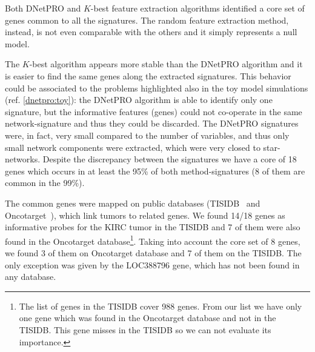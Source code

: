 \documentclass{standalone}
\begin{document}
Both \textsf{DNetPRO} and $K$-best feature extraction algorithms identified a core set of genes common to all the signatures.
The random feature extraction method, instead, is not even comparable with the others and it simply represents a null model.

The $K$-best algorithm appears more stable than the \textsf{DNetPRO} algorithm and it is easier to find the same genes along the extracted signatures.
This behavior could be associated to the problems highlighted also in the toy model simulations (ref. \ref{dnetpro:toy}): the \textsf{DNetPRO} algorithm is able to identify only one signature, but the informative features (genes) could not co-operate in the same network-signature and thus they could be discarded.
The \textsf{DNetPRO} signatures were, in fact, very small compared to the number of variables, and thus only small network components were extracted, which were very closed to star-networks.
Despite the discrepancy between the signatures we have a core of 18 genes which occurs in at least the 95\% of both method-signatures (8 of them are common in the 99\%).

The common genes were mapped on public databases (TISIDB~\cite{10.1093/bioinformatics/btz210} and Oncotarget~\cite{OT9487}), which link tumors to related genes.
We found 14/18 genes as informative probes for the KIRC tumor in the TISIDB and 7 of them were also found in the Oncotarget database\footnote{
  The list of genes in the TISIDB cover  988 genes.
  From our list we have only one gene which was found in the Oncotarget database and not in the TISIDB.
  This gene misses in the TISIDB so we can not evaluate its importance.
}.
Taking into account the core set of 8 genes, we found 3 of them on Oncotarget database and 7 of them on the TISIDB.
The only exception was given by the LOC388796 gene, which has not been found in any database.
\end{document}
